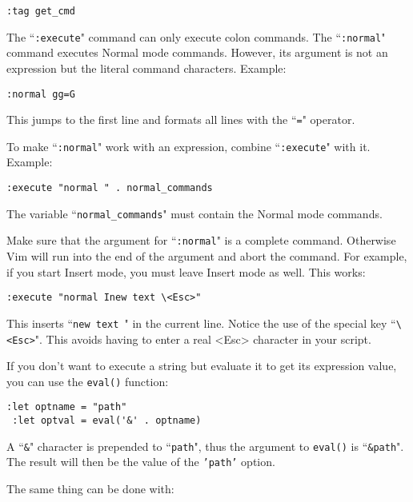 \begin{Verbatim}[samepage=true]
 :tag get_cmd
\end{Verbatim}

The ``\texttt{:execute}" command can only execute colon commands.
The ``\texttt{:normal}" command executes Normal mode commands.
However, its argument is not an expression but the literal command characters.
Example:

\begin{Verbatim}[samepage=true]
 :normal gg=G
\end{Verbatim}

This jumps to the first line and formats all lines with the ``\texttt{=}" operator.

To make ``\texttt{:normal}" work with an expression, combine ``\texttt{:execute}" with it.
Example:

\begin{Verbatim}[samepage=true]
 :execute "normal " . normal_commands
\end{Verbatim}

The variable ``\texttt{normal\_commands}" must contain the Normal mode commands.

Make sure that the argument for ``\texttt{:normal}" is a complete command.
Otherwise Vim will run into the end of the argument and abort the command.
For example, if you start Insert mode, you must leave Insert mode as well.
This works:

\begin{Verbatim}[samepage=true]
 :execute "normal Inew text \<Esc>"
\end{Verbatim}

This inserts ``\texttt{new text }" in the current line.
Notice the use of the special key ``\texttt{\textbackslash{}<Esc>}".
This avoids having to enter a real <Esc> character in your script.

If you don't want to execute a string but evaluate it to get its expression value, you can use the \texttt{eval()} function:

\begin{Verbatim}[samepage=true]
 :let optname = "path"
 :let optval = eval('&' . optname)
\end{Verbatim}

A ``\texttt{\&}" character is prepended to ``\texttt{path}", thus the argument to \texttt{eval()} is ``\texttt{\&path}".
The result will then be the value of the \texttt{'path'} option.

The same thing can be done with:

